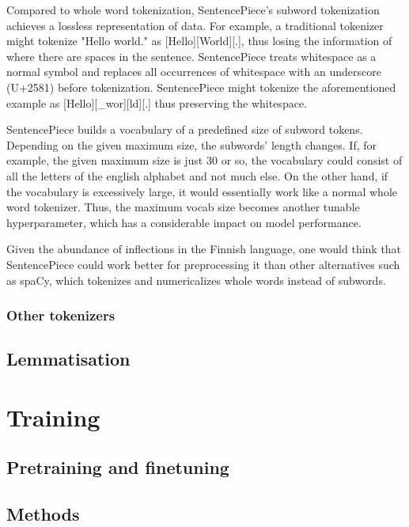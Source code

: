 Compared to whole word tokenization, SentencePiece's subword tokenization achieves a lossless representation of data. For example, a traditional tokenizer might tokenize "Hello world." as [Hello][World][.], thus losing the information of where there are spaces in the sentence. SentencePiece treats whitespace as a normal symbol and replaces all occurrences of whitespace with an underscore (U+2581) before tokenization. SentencePiece might tokenize the aforementioned example as [Hello][\_wor][ld][.] thus preserving the whitespace.\cite{kudo2018}

SentencePiece builds a vocabulary of a predefined size of subword tokens. Depending on the given maximum size, the subwords' length changes. If, for example, the given maximum size is just 30 or so, the vocabulary could consist of all the letters of the english alphabet and not much else. On the other hand, if the vocabulary is excessively large, it would essentially work like a normal whole word tokenizer. Thus, the maximum vocab size becomes another tunable hyperparameter, which has a considerable impact on model performance.

Given the abundance of inflections in the Finnish language, one would think that SentencePiece could work better for preprocessing it than other alternatives such as spaCy, which tokenizes and numericalizes whole words instead of subwords.

\subsubsection{Other tokenizers} \label{Other tokenizers}

\subsection{Lemmatisation}\label{Lemmatisation}



\section{Training} \label{Training}

\subsection{Pretraining and finetuning} \label{Pretraining and finetuning}
\subsection{Methods} \label{Methods}


